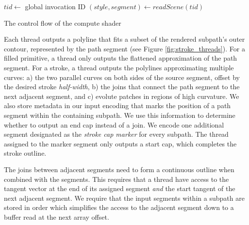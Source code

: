 \documentclass[sigconf, nonacm]{acmart}
\begin{document}
\begin{algorithm}
  $tid \gets$ global invocation ID\;
  $(style, segment) \gets readScene(tid)$\;
\caption{The control flow of the compute shader}
\label{alg:shader-flow}
\end{algorithm}

Each thread outputs a polyline that fits a subset of the rendered subpath's outer contour, represented by the path segment (see Figure \ref{fig:stroke_threads}). For a filled primitive, a thread only outputs the flattened approximation of the path segment. For a stroke, a thread outputs the polylines approximating multiple curves: a) the two parallel curves on both sides of the source segment, offset by the desired stroke \emph{half-width}, b) the joins that connect the path segment to the next adjacent segment, and c) evolute patches in regions of high curvature. We also store metadata in our input encoding that marks the position of a path segment within the containing subpath. We use this information to determine whether to output an end cap instead of a join. We encode one additional segment designated as the \emph{stroke cap marker} for every subpath. The thread assigned to the marker segment only outputs a start cap, which completes the stroke outline.

The joins between adjacent segments need to form a continuous outline when combined with the segments. This requires that a thread have access to the tangent vector at the end of its assigned segment \emph{and} the start tangent of the next adjacent segment. We require that the input segments within a subpath are stored in order which simplifies the access to the adjacent segment down to a buffer read at the next array offset.

\newcommand{\nosemic}{\SetEndCharOfAlgoLine{\relax}}%
\newcommand{\dosemic}{\SetEndCharOfAlgoLine{\string;}}%
\newcommand{\pushline}{\Indp}%
\newcommand{\popline}{\Indm\dosemic}%
\end{document}
